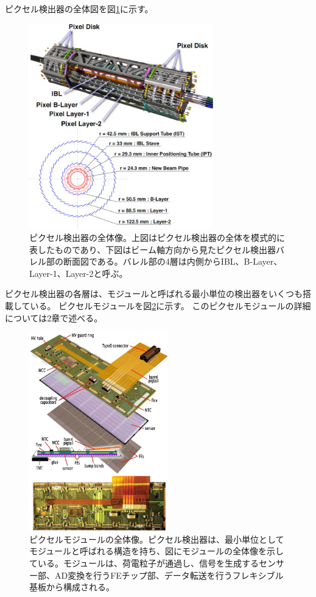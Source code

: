 ピクセル検出器の全体図を図\ref{pixel_detector_overview}に示す。
\begin{figure}[bpt]\centering
\includegraphics[width=8cm]{pixel_detector_overview}
\caption[ピクセル検出器の全体像]{ピクセル検出器の全体像\cite{1-5}。上図はピクセル検出器の全体を模式的に表したものであり、下図はビーム軸方向から見たピクセル検出器バレル部の断面図である。バレル部の4層は内側からIBL、B-Layer、Layer-1、Layer-2と呼ぶ。}
\label{pixel_detector_overview}
\end{figure}

ピクセル検出器の各層は、モジュールと呼ばれる最小単位の検出器をいくつも搭載している。
ピクセルモジュールを図\ref{pixel_detector}に示す。
このピクセルモジュールの詳細については2章で述べる。
\begin{figure}[bpt]\centering
\includegraphics[width=6cm]{pixel_detector}
\caption[ピクセルモジュールの全体像。]{ピクセルモジュールの全体像\cite{1-2}。ピクセル検出器は、最小単位としてモジュールと呼ばれる構造を持ち、図にモジュールの全体像を示している。モジュールは、荷電粒子が通過し、信号を生成するセンサー部、AD変換を行うFEチップ部、データ転送を行うフレキシブル基板から構成される。}
\label{pixel_detector}
\end{figure}


